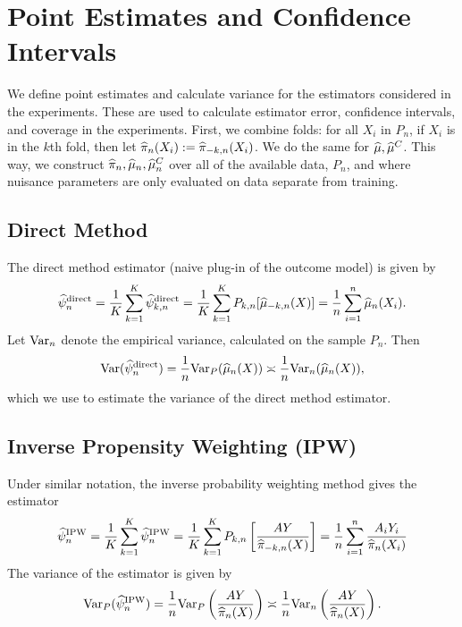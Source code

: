 

\section{Point Estimates and Confidence Intervals} %
\label{sec:ci}
We define point estimates and calculate variance for the estimators considered in the experiments. These are used to calculate estimator error, confidence intervals, and coverage in the experiments. 
First, we combine folds: for all $X_i$ in $P_n$, if $X_i$ is in the $k$th fold, then let
$\widehat{\pi}_n(X_i):=\widehat{\pi}_{-k,n}(X_i)$. 
We do the same for $\widehat{\mu}, \widehat{\mu}^C$. 
This way, we construct $\widehat{\pi}_n, \widehat{\mu}_n, \widehat{\mu}^C_n$ over all of the available data, $P_n$, and where nuisance parameters are only evaluated on data separate from training.

\subsection{Direct Method}
The direct method estimator (naive plug-in of the outcome model) is given by %
\begin{equation}
    \widehat{\psi}_{n}^{\text{direct}} = \frac{1}{K}\sum_{k=1}^{K} \widehat{\psi}_{k,n}^{\text{direct}} 
    = \frac{1}{K}\sum_{k=1}^{K}  P_{k,n}[\widehat{\mu}_{-k,n}(X)]
    = \frac{1}{n}\sum_{i=1}^n \widehat{\mu}_n(X_i).
\end{equation}
Let ${\rm Var}_n$ denote the empirical variance, calculated on the sample $P_n$. Then %
\begin{align*}
    {\rm Var}(\widehat{\psi}_{n}^{\text{direct}}) = \frac{1}{n}{\rm Var}_P(\widehat{\mu}_{n}(X)) 
    \asymp \frac{1}{n}{\rm Var}_{n}(\widehat{\mu}_{n}(X)),
\end{align*}
which we use to estimate the variance of the direct method estimator.

\subsection{Inverse Propensity Weighting (IPW)}
Under similar notation, the inverse probability weighting method gives the estimator
$$
\widehat{\psi}_{n}^{\text{IPW}} = \frac{1}{K}\sum_{k=1}^{K} \widehat{\psi}_{n}^{\text{IPW}} 
    = \frac{1}{K}\sum_{k=1}^{K} P_{k,n} \left[ \frac{AY}{\widehat{\pi}_{-k,n}(X)} \right]
    =\frac{1}{n}\sum_{i=1}^n \frac{A_iY_i}{\widehat{\pi}_n(X_i)}
$$
The variance of the estimator is given by
\begin{align*}
    {\rm Var}_P(\widehat{\psi}_{n}^{\text{IPW}}) = \frac{1}{n}{\rm Var}_P\left(\frac{AY}{\widehat{\pi}_{n}(X)} \right) 
    \asymp \frac{1}{n}{\rm Var}_{n}\left(\frac{AY}{\widehat{\pi}_{n}(X)} \right).
\end{align*}

